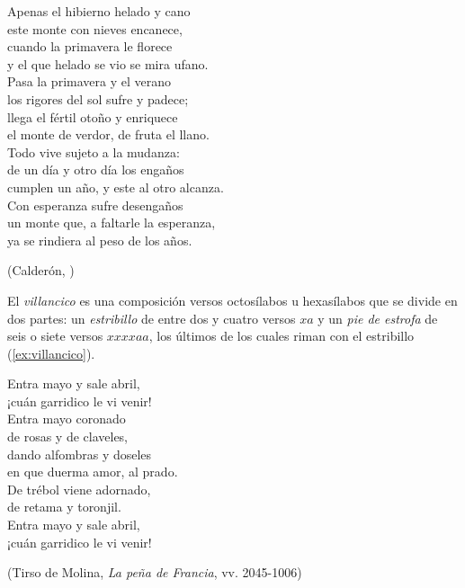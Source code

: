 \begin{exe}
	\ex\label{ex:soneto}Apenas el hibierno helado y cano\\
	este monte con nieves encanece,\\
	cuando la primavera le florece\\
	y el que helado se vio se mira ufano.\vspace{.333\baselineskip}\\
	Pasa la primavera y el verano\\
	los rigores del sol sufre y padece;\\
	llega el fértil otoño y enriquece\\
	el monte de verdor, de fruta el llano.\vspace{.333\baselineskip}\\
	Todo vive sujeto a la mudanza:\\
	de un día y otro día los engaños\\
	cumplen un año, y este al otro alcanza.\vspace{.333\baselineskip}\\
	Con esperanza sufre desengaños\\
	un monte que, a faltarle la esperanza,\\
	ya se rindiera al peso de los años.\\	
	\strut\hfill(Calderón, )
\end{exe}

El \textit{villancico} es una composición versos octosílabos u hexasílabos que se divide en dos partes: un \textit{estribillo} de entre dos y cuatro versos $xa$ y un \textit{pie de estrofa} de seis o siete versos $xxxxaa$, los últimos de los cuales riman con el estribillo (\ref{ex:villancico}).

\begin{exe}
	\ex\label{ex:villancico}Entra mayo y sale abril,\\
	¡cuán garridico le vi venir!\vspace{.333\baselineskip}\\
	Entra mayo coronado\\
	de rosas y de claveles,\\
	dando alfombras y doseles\\
	en que duerma amor, al prado.\\
	De trébol viene adornado,\\
	de retama y toronjil.\vspace{.333\baselineskip}\\
	Entra mayo y sale abril,\\
	¡cuán garridico le vi venir!\\
	\strut\hfill(Tirso de Molina, \textit{La peña de Francia}, vv. 2045-1006\nocite{tirso_penafrancia})
\end{exe}

